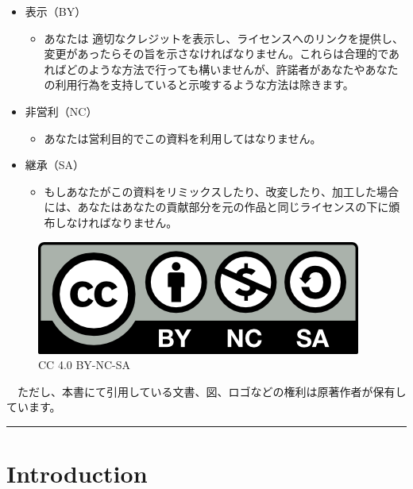 \documentclass[
  12pt,
]{book}
\providecommand{\tightlist}{%
  \setlength{\itemsep}{0pt}\setlength{\parskip}{0pt}}
\begin{document}
\begin{itemize}
\item
  表示（BY）

  \begin{itemize}
  \tightlist
  \item
    あなたは 適切なクレジットを表示し、ライセンスへのリンクを提供し、変更があったらその旨を示さなければなりません。これらは合理的であればどのような方法で行っても構いませんが、許諾者があなたやあなたの利用行為を支持していると示唆するような方法は除きます。
  \end{itemize}
\item
  非営利（NC）

  \begin{itemize}
  \tightlist
  \item
    あなたは営利目的でこの資料を利用してはなりません。
  \end{itemize}
\item
  継承（SA）

  \begin{itemize}
  \tightlist
  \item
    もしあなたがこの資料をリミックスしたり、改変したり、加工した場合には、あなたはあなたの貢献部分を元の作品と同じライセンスの下に頒布しなければなりません。
  \end{itemize}
\end{itemize}

\begin{figure}
\centering
\includegraphics{"./fig/by-nc-sa.png"}
\caption{CC 4.0 BY-NC-SA}
\end{figure}

　ただし、本書にて引用している文書、図、ロゴなどの権利は原著作者が保有しています。

\begin{center}\rule{0.5\linewidth}{0.5pt}\end{center}

\hypertarget{part-introduction}{%
\part{Introduction}\label{part-introduction}}
\end{document}
